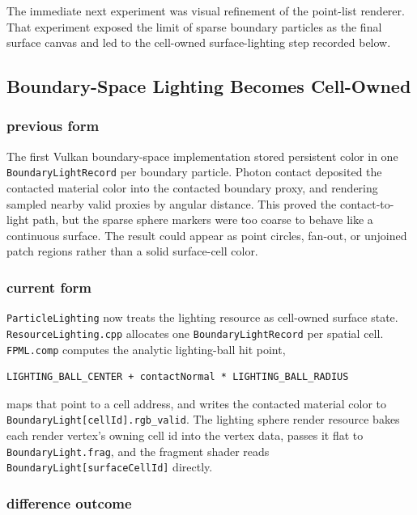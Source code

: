 The immediate next experiment was visual refinement of the point-list
renderer.  That experiment exposed the limit of sparse boundary particles as
the final surface canvas and led to the cell-owned surface-lighting step
recorded below.

\subsection{Boundary-Space Lighting Becomes Cell-Owned}

\subsubsection{previous form}

The first Vulkan boundary-space implementation stored persistent color in one
\texttt{BoundaryLightRecord} per boundary particle.  Photon contact deposited
the contacted material color into the contacted boundary proxy, and rendering
sampled nearby valid proxies by angular distance.  This proved the
contact-to-light path, but the sparse sphere markers were too coarse to behave
like a continuous surface.  The result could appear as point circles, fan-out,
or unjoined patch regions rather than a solid surface-cell color.

\subsubsection{current form}

\texttt{ParticleLighting} now treats the lighting resource as cell-owned
surface state.  \texttt{ResourceLighting.cpp} allocates one
\texttt{BoundaryLightRecord} per spatial cell.  \texttt{FPML.comp} computes
the analytic lighting-ball hit point,
\begin{verbatim}
LIGHTING_BALL_CENTER + contactNormal * LIGHTING_BALL_RADIUS
\end{verbatim}
maps that point to a cell address, and writes the contacted material color to
\texttt{BoundaryLight[cellId].rgb\_valid}.  The lighting sphere render resource
bakes each render vertex's owning cell id into the vertex data, passes it flat
to \texttt{BoundaryLight.frag}, and the fragment shader reads
\texttt{BoundaryLight[surfaceCellId]} directly.

\subsubsection{difference outcome}

